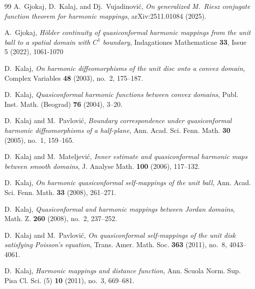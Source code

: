 \documentclass{amsart}
\begin{document}
\begin{thebibliography}{99}
A.~Gjokaj, D.~Kalaj, and Dj.~Vujadinovi\'{c},
\newblock \emph{On generalized M.~Riesz conjugate function theorem for harmonic mappings},
\newblock arXiv:2511.01084 (2025).


A.~Gjokaj,
\newblock \emph{Hölder continuity of quasiconformal harmonic mappings from the unit ball to a spatial domain with $C^1$ boundary},
\newblock Indagationes Mathematicae \textbf{33}, Issue 5 (2022), 1061-1070


D.~Kalaj,
\newblock \emph{On harmonic diffeomorphisms of the unit disc onto a convex domain},
\newblock Complex Variables \textbf{48} (2003), no.~2, 175--187.

D.~Kalaj,
\newblock \emph{Quasiconformal harmonic functions between convex domains},
\newblock Publ. Inst. Math. (Beograd) \textbf{76} (2004), 3--20.

D.~Kalaj and M.~Pavlovi\'{c},
\newblock \emph{Boundary correspondence under quasiconformal harmonic diffeomorphisms of a half-plane},
\newblock Ann. Acad. Sci. Fenn. Math. \textbf{30} (2005), no.~1, 159--165.

D.~Kalaj and M.~Mateljevi\'{c},
\newblock \emph{Inner estimate and quasiconformal harmonic maps between smooth domains},
\newblock J. Analyse Math. \textbf{100} (2006), 117--132.

D.~Kalaj,
\newblock \emph{On harmonic quasiconformal self-mappings of the unit ball},
\newblock Ann. Acad. Sci. Fenn. Math. \textbf{33} (2008), 261--271.

D.~Kalaj,
\newblock \emph{Quasiconformal and harmonic mappings between Jordan domains},
\newblock Math. Z. \textbf{260} (2008), no.~2, 237--252.

D.~Kalaj and M.~Pavlovi\'{c},
\newblock \emph{On quasiconformal self-mappings of the unit disk satisfying Poisson's equation},
\newblock Trans. Amer. Math. Soc. \textbf{363} (2011), no.~8, 4043--4061.

D.~Kalaj,
\newblock \emph{Harmonic mappings and distance function},
\newblock Ann. Scuola Norm. Sup. Pisa Cl. Sci. (5) \textbf{10} (2011), no.~3, 669--681.


\end{thebibliography}
\end{document}
